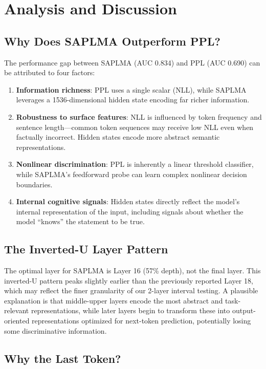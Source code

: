 \documentclass[11pt]{article}
\begin{document}
\section{Analysis and Discussion}

\subsection{Why Does SAPLMA Outperform PPL?}

The performance gap between SAPLMA (AUC 0.834) and PPL (AUC 0.690) can be attributed to four factors:

\begin{enumerate}
    \item \textbf{Information richness}: PPL uses a single scalar (NLL), while SAPLMA leverages a 1536-dimensional hidden state encoding far richer information.
    \item \textbf{Robustness to surface features}: NLL is influenced by token frequency and sentence length---common token sequences may receive low NLL even when factually incorrect. Hidden states encode more abstract semantic representations.
    \item \textbf{Nonlinear discrimination}: PPL is inherently a linear threshold classifier, while SAPLMA's feedforward probe can learn complex nonlinear decision boundaries.
    \item \textbf{Internal cognitive signals}: Hidden states directly reflect the model's internal representation of the input, including signals about whether the model ``knows'' the statement to be true.
\end{enumerate}

\subsection{The Inverted-U Layer Pattern}

The optimal layer for SAPLMA is Layer 16 (57\% depth), not the final layer. This inverted-U pattern peaks slightly earlier than the previously reported Layer 18, which may reflect the finer granularity of our 2-layer interval testing. A plausible explanation is that middle-upper layers encode the most abstract and task-relevant representations, while later layers begin to transform these into output-oriented representations optimized for next-token prediction, potentially losing some discriminative information.

\subsection{Why the Last Token?}
\end{document}

